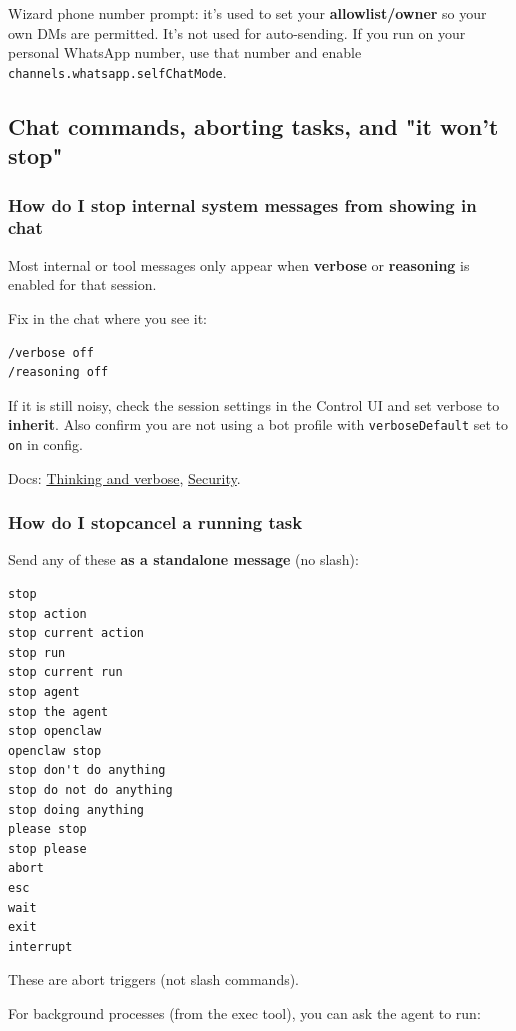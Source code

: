 Wizard phone number prompt: it's used to set your \textbf{allowlist/owner} so your own DMs are permitted. It's not used for auto-sending. If you run on your personal WhatsApp number, use that number and enable \texttt{channels.whatsapp.selfChatMode}.

\subsection{Chat commands, aborting tasks, and "it won't stop"}


\subsubsection{How do I stop internal system messages from showing in chat}


Most internal or tool messages only appear when \textbf{verbose} or \textbf{reasoning} is enabled
for that session.

Fix in the chat where you see it:

\begin{lstlisting}
/verbose off
/reasoning off
\end{lstlisting}


If it is still noisy, check the session settings in the Control UI and set verbose
to \textbf{inherit}. Also confirm you are not using a bot profile with \texttt{verboseDefault} set
to \texttt{on} in config.

Docs: \href{/tools/thinking}{Thinking and verbose}, \href{/gateway/security\#reasoning--verbose-output-in-groups}{Security}.

\subsubsection{How do I stopcancel a running task}


Send any of these \textbf{as a standalone message} (no slash):

\begin{lstlisting}
stop
stop action
stop current action
stop run
stop current run
stop agent
stop the agent
stop openclaw
openclaw stop
stop don't do anything
stop do not do anything
stop doing anything
please stop
stop please
abort
esc
wait
exit
interrupt
\end{lstlisting}


These are abort triggers (not slash commands).

For background processes (from the exec tool), you can ask the agent to run:

